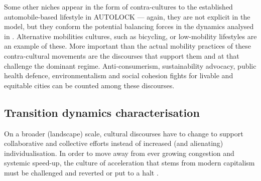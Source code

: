 Some other niches appear in the form of contra-cultures to the established automobile-based lifestyle in AUTOLOCK --- again, they are not explicit in the model, but they conform the potential balancing forces in the dynamics analysed in . Alternative mobilities cultures, such as bicycling, or low-mobility lifestyles are an example of these. More important than the actual mobility practices of these contra-cultural movements are the discourses that support them and at that challenge the dominant regime. Anti-consumerism, sustainability advocacy, public health defence, environmentalism and social cohesion fights for livable and equitable cities can be counted among these discourses.

\subsection{Transition dynamics characterisation}
\label{ss:results:transition_dynamics}
%
%
%


On a broader (landscape) scale, cultural discourses have to change to support collaborative and collective efforts instead of increased (and alienating) individualisation. In order to move away from ever growing congestion and systemic speed-up, the culture of acceleration that stems from modern capitalism must be challenged and reverted or put to a halt \textcite{zijlstra2012_SocioSpatialPerspective}.

